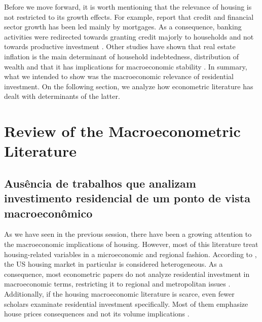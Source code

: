 \documentclass[12pt, a4paper]{article}
\begin{document}
Before we move forward, it is worth mentioning that the relevance of housing is not restricted to its growth effects. 
For example, \textcite{jorda_great_2016} report that credit and financial sector growth has been led mainly by mortgages. 
As a consequence, banking activities were redirected towards granting credit majorly to households and not towards productive investment \cites{erturk_banks_2007}{kohl_more_2018}.
Other studies have shown that real estate inflation is the main determinant of household indebtedness, distribution of wealth and that it has implications for macroeconomic stability \cites{ryoo_household_2015}{stockhammer_debt-driven_2016}{barnes_private_2016}{johnston_global_2017}{mian_household_2017}{anderson_politics_2020}{fuller_housing_2020}. 
In summary, what we intended to show was the macroeconomic relevance of residential investment.
On the following section, we analyze how econometric literature has dealt with determinants of the latter.
\section{Review of the Macroeconometric Literature}
\label{sec:orge622e6c}
\label{sec:empirical_review}
\subsection{Ausência de trabalhos que analizam investimento residencial de um ponto de vista macroeconômico}
\label{sec:org3da3d7b}
As we have seen in the previous session, there have been a growing attention to the macroeconomic implications of housing.
However, most of this literature treat housing-related variables in a microeconomic and regional fashion.
According to \textcite{arestis_u.s._2008}, the US housing market in particular is considered heterogeneous.
As a consequence, most econometric papers do not analyze residential investment in macroeconomic terms, restricting it to regional and metropolitan issues \cite{arestis_u.s._2008}.
Additionally, if the housing macroeconomic literature is scarce, even fewer scholars examinate residential investment specifically.
Most of them emphasize house prices consequences and not its volume implications \cites{arestis_residential_2015}{perez_Montiel_2021}.
\end{document}
